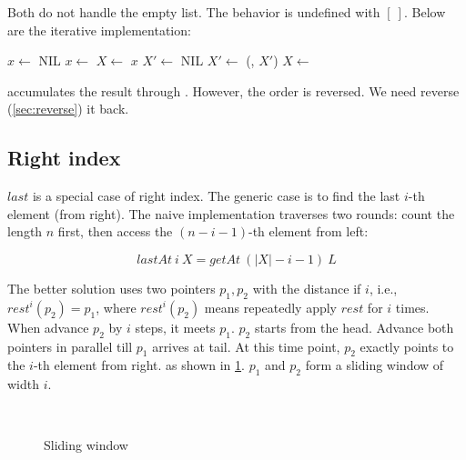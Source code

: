 \documentclass[b5paper]{article}
\begin{document}
Both do not handle the empty list. The behavior is undefined with $[\ ]$. Below are the iterative implementation:

\begin{algorithmic}[1]
  \State $x \gets $ NIL
    \State $x \gets $ 
    \State $X \gets $ 
  \EndWhile
  \State \Return $x$
\EndFunction
\Statex
{}
  \State $X' \gets $ NIL
   
    \State $X' \gets$ (, $X'$)
    \State $X \gets $ 
  \EndWhile
  \State \Return {}
\EndFunction
\end{algorithmic}

 accumulates the result through . However, the order is reversed. We need reverse (\cref{sec:reverse}) it back.

\subsection{Right index}
 

$last$ is a special case of right index. The generic case is to find the last $i$-th element (from right). The naive implementation traverses two rounds: count the length $n$ first, then access the $(n - i - 1)$-th element from left:

\[
  lastAt\ i\ X = getAt\ (|X| - i - 1)\ L
\]

The better solution uses two pointers $p_1, p_2$ with the distance if $i$, i.e., $rest^i(p_2) = p_1$, where $rest^i(p_2)$ means repeatedly apply $rest$ for $i$ times. When advance $p_2$ by $i$ steps, it meets $p_1$. $p_2$ starts from the head. Advance both pointers in parallel till $p_1$ arrives at tail. At this time point, $p_2$ exactly points to the $i$-th element from right. as shown in \cref{fig:list-rindex}. $p_1$ and $p_2$ form a sliding window of width $i$.

\begin{figure}[htbp]
  \centering
   \\
  \caption{Sliding window}
  \label{fig:list-rindex}
\end{figure}
\end{document}
